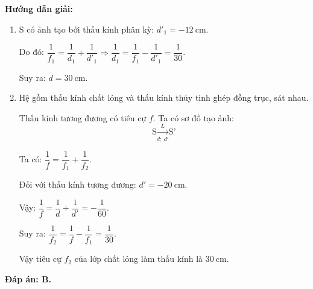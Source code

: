 {

\begin{center}
	\textbf{Hướng dẫn giải:}
\end{center}

{\begin{enumerate}
	\item S có ảnh tạo bởi thấu kính phân kỳ: $d'_1=-12\ \text{cm}$.
	
	Do đó: 
	$\dfrac{1}{f_1}=\dfrac{1}{d_1}+\dfrac{1}{d'_1}\Rightarrow \dfrac{1}{d_1}=\dfrac{1}{f_1}-\dfrac{1}{d'_1}=\dfrac{1}{30}$.
	
	Suy ra: $d=30\ \text{cm}$.
	\item Hệ gồm thấu kính chất lỏng và thấu kính thủy tinh ghép đồng trục, sát nhau.
	
	Thấu kính tương đương có tiêu cự $f$.
	Ta có sơ đồ tạo ảnh:
	\begin{equation}
	\text{S}\xrightarrow[d;\ d']{L} \text{S'}
	\end{equation}
		
	Ta có: $\dfrac{1}{f}=\dfrac{1}{f_1}+\dfrac{1}{f_2}$.
	
	Đối với thấu kính tương đương: $d'=-20\ \text{cm}$.
	
	Vậy: $\dfrac{1}{f}=\dfrac{1}{d}+\dfrac{1}{d'}=-\dfrac{1}{60}$.
	
	Suy ra: $\dfrac{1}{f_2}=\dfrac{1}{f}-\dfrac{1}{f_1}=\dfrac{1}{30}$.
	
	Vậy tiêu cự $f_2$ của lớp chất lỏng làm thấu kính là $30\ \text{cm}$.
	
\end{enumerate}
		

	\textbf{Đáp án: B.}
}
}
